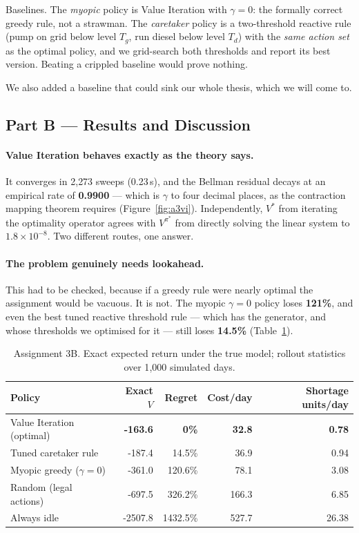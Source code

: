 \documentclass{ai-lab-report}
\begin{document}
Baselines. The \emph{myopic} policy is Value Iteration with $\gamma = 0$: the formally correct
greedy rule, not a strawman. The \emph{caretaker} policy is a two-threshold reactive rule (pump
on grid below level $T_g$, run diesel below level $T_d$) with the \emph{same action set} as the
optimal policy, and we grid-search both thresholds and report its best version. Beating a
crippled baseline would prove nothing.

We also added a baseline that could sink our whole thesis, which we will come to.

\subsection{Part B --- Results and Discussion}

\paragraph{Value Iteration behaves exactly as the theory says.}
It converges in 2{,}273 sweeps (0.23\,s), and the Bellman residual decays at an empirical rate
of \textbf{0.9900} --- which is $\gamma$ to four decimal places, as the contraction mapping
theorem requires (Figure~\ref{fig:a3vi}). Independently, $V^*$ from iterating the optimality
operator agrees with $V^{\pi^*}$ from directly solving the linear system to
$1.8 \times 10^{-8}$. Two different routes, one answer.

\paragraph{The problem genuinely needs lookahead.}
This had to be checked, because if a greedy rule were nearly optimal the assignment would be
vacuous. It is not. The myopic $\gamma = 0$ policy loses \textbf{121\%}, and even the best tuned
reactive threshold rule --- which has the generator, and whose thresholds we optimised for it ---
still loses \textbf{14.5\%} (Table~\ref{tab:a3b}).

\begin{table}[H]
\centering
\caption{Assignment 3B. Exact expected return under the true model; rollout statistics over
1{,}000 simulated days.}
\label{tab:a3b}
\begin{tabular}{lrrrr}
\toprule
Policy & Exact $V$ & Regret & Cost/day & Shortage units/day \\
\midrule
Value Iteration (optimal)      & \textbf{-163.6} & \textbf{0\%} & \textbf{32.8} & \textbf{0.78} \\
Tuned caretaker rule           & -187.4 & 14.5\%  & 36.9 & 0.94 \\
Myopic greedy ($\gamma = 0$)   & -361.0 & 120.6\% & 78.1 & 3.08 \\
Random (legal actions)         & -697.5 & 326.2\% & 166.3 & 6.85 \\
Always idle                    & -2507.8 & 1432.5\% & 527.7 & 26.38 \\
\bottomrule
\end{tabular}
\end{table}
\end{document}

